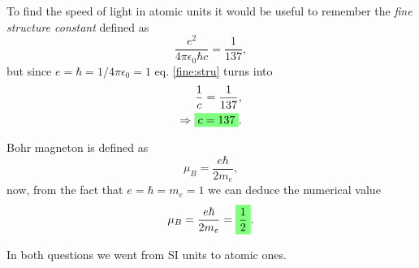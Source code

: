 \begin{questions}
\begin{solution}
To find the speed of light in atomic units it would be useful to remember the \textit{fine structure constant} defined as
\begin{equation}
  \frac{e^2}{4\pi \epsilon_0\hbar c} = \frac{1}{137},
  \label{fine:stru}
\end{equation}
but since $e=\hbar = 1/4\pi\epsilon_0 = 1$  eq. \ref{fine:stru} turns into
\begin{eqnarray}
  \frac{1}{c} = \frac{1}{137},\nonumber\\
  \Rightarrow \hlgreen{c = 137}.
\end{eqnarray}

\end{solution}

\begin{solution}
  Bohr magneton is defined as
  \begin{equation}
    \mu_B = \frac{e\hbar}{2m_e},
  \end{equation}
  now, from the fact that $e=\hbar = m_e=1$ we can deduce the numerical value
  \begin{equation}
    \mu_B = \frac{e\hbar}{2m_e} = \hlgreen{\frac{1}{2}}.
  \end{equation}

  In both questions we went from SI units to atomic ones.

\end{solution}

\end{questions}

